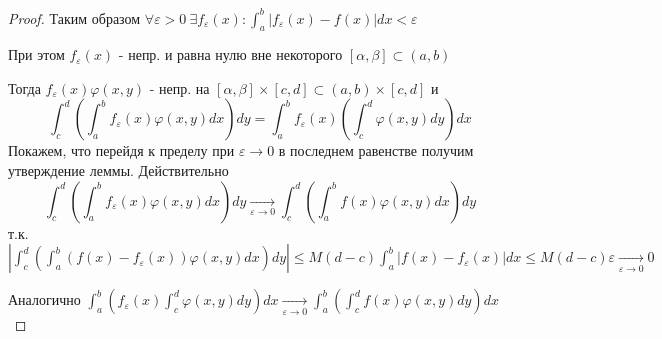 \documentclass{article}
\theoremstyle{definition}
\numberwithin{theorem}{section}
\numberwithin{lemma}{section}
\numberwithin{definition}{section}
\numberwithin{corollary}{section}
\numberwithin{equation}{section}
\let\phi\varphi
\let\epsilon\varepsilon
\begin{document}
\begin{proof}
  Таким образом $\forall \epsilon > 0 \ \exists f_\epsilon(x): \int_{a}^{b}|f_\epsilon(x)-f(x)|dx<\epsilon$

  При этом $f_{\epsilon}(x)$ - непр. и равна нулю вне некоторого $[\alpha,\beta]\subset(a,b)$

  Тогда $f_\epsilon(x)\phi(x,y)$ - непр. на $[\alpha,\beta]\times [c,d] \subset (a,b)\times [c,d]$ и
  \[
    \int_{c}^{d}(\int_{a}^{b}f_\epsilon(x)\phi(x,y)dx)dy=\int_{a}^{b}f_\epsilon(x)(\int_{c}^{d}\phi(x,y)dy)dx
  \]
  Покажем, что перейдя к пределу при $\epsilon \to 0$ в последнем равенстве получим
  утверждение леммы.
  Действительно
  \[
    \int_{c}^{d}(\int_{a}^{b}f_{\epsilon}(x)\phi(x,y)dx)dy \underset{\epsilon\to 0}{\to}\int_{c}^{d}(\int_{a}^{b}f(x)\phi(x,y)dx)dy
  \]
  т.к. $|\int_{c}^{d}(\int_{a}^{b}(f(x)-f_\epsilon(x))\phi(x,y)dx)dy| \le M(d-c)\int_{a}^{b}|f(x)-f_\epsilon(x)|dx \le M(d-c)\epsilon \underset{\epsilon\to 0}{\to}0$
  
  Аналогично $\int_{a}^{b}(f_\epsilon(x)\int_{c}^{d}\phi(x,y)dy)dx \underset{\epsilon\to 0}{\to}\int_{a}^{b}(\int_{c}^{d}f(x)\phi(x,y)dy)dx$
\end{proof}

\end{document}
